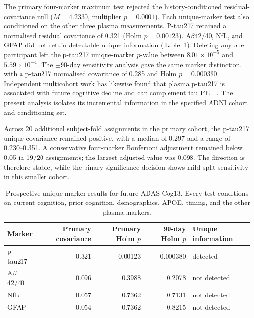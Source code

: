 \documentclass[11pt]{article}
\theoremstyle{definition}
\begin{document}
The primary four-marker maximum test rejected the history-conditioned residual-covariance
null ($M=4.2330$, multiplier $p=0.0001$). Each unique-marker test also conditioned on the
other three plasma measurements. P-tau217 retained a normalised residual covariance of 0.321
(Holm $p=0.00123$). A$\beta$42/40, NfL, and GFAP did not retain detectable unique information
(Table~\ref{tab:adni-prospective}). Deleting any one participant left the p-tau217 unique-marker
$p$-value between $8.01\times10^{-5}$ and $5.59\times10^{-4}$. The $\pm90$-day sensitivity
analysis gave the same marker distinction, with a p-tau217 normalised covariance of 0.285 and
Holm $p=0.000380$. Independent multicohort work has likewise found that plasma p-tau217 is
associated with future cognitive decline and can complement tau PET \cite{ossenkoppele2025}.
The present analysis isolates its incremental information in the specified ADNI cohort and
conditioning set.

Across 20 additional subject-fold assignments in the primary cohort, the p-tau217 unique
covariance remained positive, with a median of 0.297 and a range of 0.230--0.351. A
conservative four-marker Bonferroni adjustment remained below 0.05 in 19/20 assignments; the
largest adjusted value was 0.098. The direction is therefore stable, while the binary
significance decision shows mild split sensitivity in this smaller cohort.

\begin{table}[!ht]
\centering
\caption{Prospective unique-marker results for future ADAS-Cog13. Every test conditions on
current cognition, prior cognition, demographics, APOE, timing, and the other plasma markers.}
\label{tab:adni-prospective}
\begin{tabular}{lrrrl}
\toprule
Marker & Primary covariance & Primary Holm $p$ & 90-day Holm $p$ & Unique information \\
\midrule
p-tau217 & 0.321 & 0.00123 & 0.000380 & detected \\
A$\beta$42/40 & 0.096 & 0.3988 & 0.2078 & not detected \\
NfL & 0.057 & 0.7362 & 0.7131 & not detected \\
GFAP & $-0.054$ & 0.7362 & 0.8215 & not detected \\
\bottomrule
\end{tabular}
\end{table}
\end{document}
